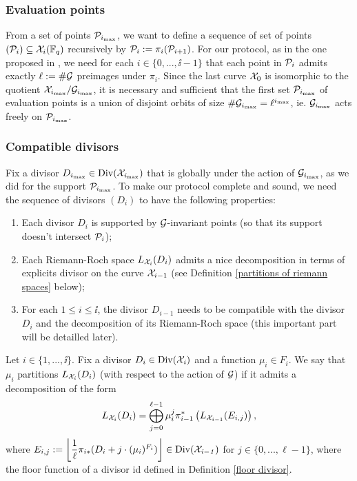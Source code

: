 \documentclass[10pt]{article}
\begin{document}
\s

\subsubsection{Evaluation points}

\s

From a set of points $\mathcal{P}_{i_{\rm{max}}}$, we want to define a sequence of set of points $(\mathcal{P}_i) \subseteq \mathcal{X}_i(\mathbb{F}_q)$ recursively by $\mathcal{P}_i := \pi_i(\mathcal{P}_{i+1})$. For our protocol, as in the one proposed in \cite{IOPP}, we need for each $i \in \{0,...,\ii-1\}$ that each point in $\mathcal{P}_i$ admits exactly $\ell := \#\mathcal{G}$ preimages under $\pi_i$. Since the last curve $\mathcal{X}_0$ is isomorphic to the quotient $\mathcal{X}_{i_{\rm{max}}}/\mathcal{G}_{i_{\rm{max}}}$, it is necessary and sufficient that the first set $\mathcal{P}_{i_{\rm{max}}}$ of evaluation points is a union of disjoint orbits of size $\#\mathcal{G}_{i_{\rm{max}}} = \ell^{i_{\rm{max}}}$, ie. $\mathcal{G}_{i_{\rm{max}}}$ acts freely on $\mathcal{P}_{i_{\rm{max}}}$.

\s

\subsubsection{Compatible divisors}

\s

Fix a divisor $D_{i_{\rm{max}}} \in \rm Div \it (\mathcal{X}_{i_{\rm{max}}})$ that is globally under the action of $\mathcal{G}_{i_{\rm{max}}}$, as we did for the support $\mathcal{P}_{i_{\rm{max}}}$. To make our protocol complete and sound, we need the sequence of divisors $(D_i)$ to have the following properties:

\begin{enumerate}
\item Each divisor $D_i$ is supported by $\mathcal{G}$-invariant points (so that its support doesn't intersect $\mathcal{P}_i$);
\item Each Riemann-Roch space $L_{\mathcal{X}_i}(D_i)$ admits a nice decomposition in terms of explicits divisor on the curve $\mathcal{X}_{i-1}$ (see Definition \ref{partitions of riemann spaces} below);
\item For each $1 \leq i \leq \ii$, the divisor $D_{i-1}$ needs to be compatible with the divisor $D_i$ and the decomposition of its Riemann-Roch space (this important part will be detailled later).
\end{enumerate}

\s

\begin{def1} \label{partitions of riemann spaces}
Let $i \in \{1,...,\ii\}$. Fix a divisor $D_i \in \rm Div \it (\mathcal{X}_i)$ and a function $\mu_i \in F_i$. We say that $\mu_i$ partitions $L_{\mathcal{X}_i}(D_i)$ (with respect to the action of $\mathcal{G}$) if it admits a decomposition of the form
\begin{equation}
L_{\mathcal{X}_i}(D_i) = \bigoplus\limits_{j=0}^{\ell -1} \mu_i^j \pi_{i-1}^*\left(L_{\mathcal{X}_{i-1}}(E_{i,j})\right),
\end{equation}
where $E_{i,j} := \left\lfloor \dfrac{1}{\ell} \pi_{i*}(D_i+j \cdot (\mu_i)^{F_i})\right\rfloor \in \rm Div \it (\mathcal{X}_{i-1})$ for $j \in \{0,...,\ell -1\}$, where the floor function of a divisor id defined in Definition \ref{floor divisor}.
\end{def1}
\end{document}
